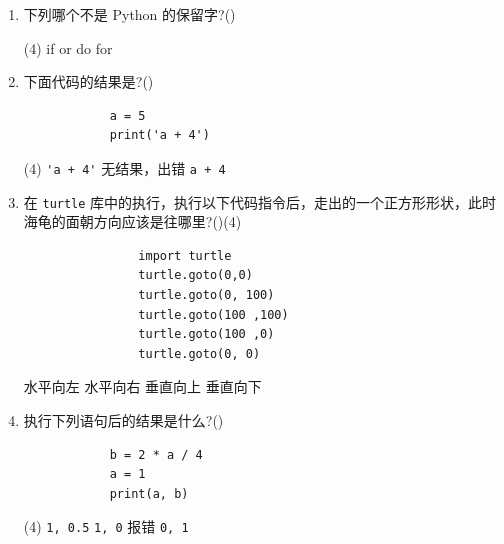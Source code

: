 \documentclass[11pt]{ctexart}
\begin{document}
\begin{enumerate}
        \item 下列哪个不是 Python 的保留字?(\qquad)
        \begin{tasks}(4)
            \task if
            \task or
            \task do
            \task for
        \end{tasks}

        \newpage
        \item 下面代码的结果是?(\qquad)
        \begin{lstlisting}
            a = 5
            print('a + 4')
        \end{lstlisting}
        \begin{tasks}(4)
            \task \lstinline{'a + 4'}
            \task 无结果，出错
            \task \lstinline{a + 4}
        \end{tasks}

        \item 在 \lstinline{turtle} 库中的执行，执行以下代码指令后，走出的一个正方形形状，此时海龟的面朝方向应该是往哪里?(\qquad)(4)
        
        \begin{minipage}{.53\textwidth}
            \begin{lstlisting}
                import turtle
                turtle.goto(0,0)
                turtle.goto(0, 100)
                turtle.goto(100 ,100)
                turtle.goto(100 ,0)
                turtle.goto(0, 0)
            \end{lstlisting}
        \end{minipage}
        \begin{minipage}{.4\textwidth}
            \begin{tasks}
                \task 水平向左
                \task 水平向右
                \task 垂直向上
                \task 垂直向下
            \end{tasks}
        \end{minipage}     

        \item 执行下列语句后的结果是什么?(\qquad)
        \begin{lstlisting}
            b = 2 * a / 4
            a = 1
            print(a, b)
        \end{lstlisting}
        \begin{tasks}(4)
            \task \lstinline{1, 0.5}
            \task \lstinline{1, 0}
            \task 报错
            \task \lstinline{0, 1}
        \end{tasks}


\end{enumerate}
\end{document}

